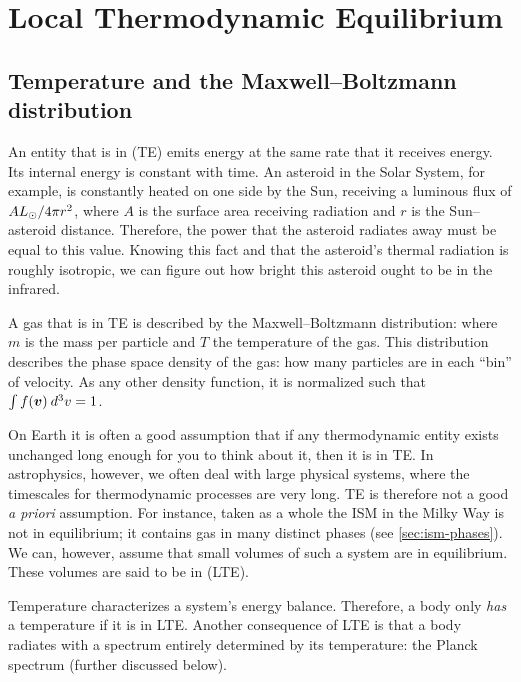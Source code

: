 \section{Local Thermodynamic Equilibrium}
\subsection{Temperature and the Maxwell--Boltzmann distribution}
An entity that is in  (TE) emits energy at the same rate that it receives energy. Its internal energy is constant with time. An asteroid in the Solar System, for example, is constantly heated on one side by the Sun, receiving a luminous flux of $A {L_\odot}/4\pi r^2$, where $A$ is the surface area receiving radiation and $r$ is the Sun--asteroid distance. Therefore, the power that the asteroid radiates away must be equal to this value. Knowing this fact and that the asteroid's thermal radiation is roughly isotropic, we can figure out how bright this asteroid ought to be in the infrared.

A gas that is in TE is described by the Maxwell--Boltzmann distribution:
where $m$ is the mass per particle and $T$ the temperature of the gas. This distribution describes the phase space density of the gas: how many particles are in each ``bin'' of velocity. As any other density function, it is normalized such that $\int f(\vb*{v}) \: d^3v = 1$.

On Earth it is often a good assumption that if any thermodynamic entity exists unchanged long enough for you to think about it, then it is in TE. In astrophysics, however, we often deal with large physical systems, where the timescales for thermodynamic processes are very long. TE is therefore not a good \textit{a priori} assumption. For instance, taken as a whole the ISM in the Milky Way is not in equilibrium; it contains gas in many distinct phases (see \textsection\ref{sec:ism-phases}). We can, however, assume that small volumes of such a system are in equilibrium. These volumes are said to be in  (LTE).

Temperature characterizes a system's energy balance. Therefore, a body only \textit{has} a temperature if it is in LTE. Another consequence of LTE is that a body radiates with a spectrum entirely determined by its temperature: the Planck spectrum (further discussed below).

